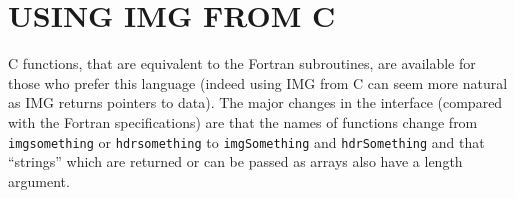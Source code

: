 \documentclass[twoside,11pt]{article}
\newcommand{\xlabel}[1]{}
\renewcommand{\_}{\texttt{\symbol{95}}}
\newcommand{\myverb}[1]{{\texttt{#1}}}
\begin{document}
\newpage

\section{USING \xlabel{IMGCinterface}IMG FROM C\label{IMGCinterface}}

C functions, that are equivalent to the Fortran subroutines, are
available for those who prefer this language (indeed using IMG from C
can seem more natural as IMG returns pointers to data).  The major
changes in the interface (compared with the Fortran specifications)
are that the names of functions change from \myverb{img\_something} or
\myverb{hdr\_something} to \myverb{imgSomething} and
\myverb{hdrSomething} and that ``strings'' which are returned or can
be passed as arrays also have a length argument.

\newcommand{\cnoteroutine}[4]{
   \item {\small \texttt{#1~#2 #3}} \nopagebreak \\ {\em #4 }
}
\end{document}
